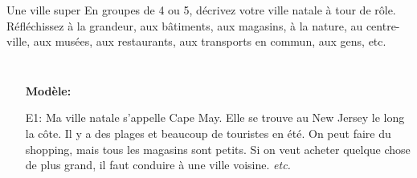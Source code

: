 \begin{frame}{Une ville super}
  En groupes de 4 ou 5, décrivez votre ville natale à tour de rôle.
  Réfléchissez à la grandeur, aux bâtiments, aux magasins, à la nature, au centre-ville, aux musées, aux restaurants, aux transports en commun, aux gens, etc.
  \begin{columns}
    \small
      \begin{itemize}
        \item[] \textbf{Modèle:}
        \item[E1:] Ma ville natale s'appelle Cape May. Elle se trouve au New Jersey le long la côte. Il y a des plages et beaucoup de touristes en été. On peut faire du shopping, mais tous les magasins sont petits. Si on veut acheter quelque chose de plus grand, il faut conduire à une ville voisine. \emph{etc.}
      \end{itemize}
  \end{columns}
\end{frame}